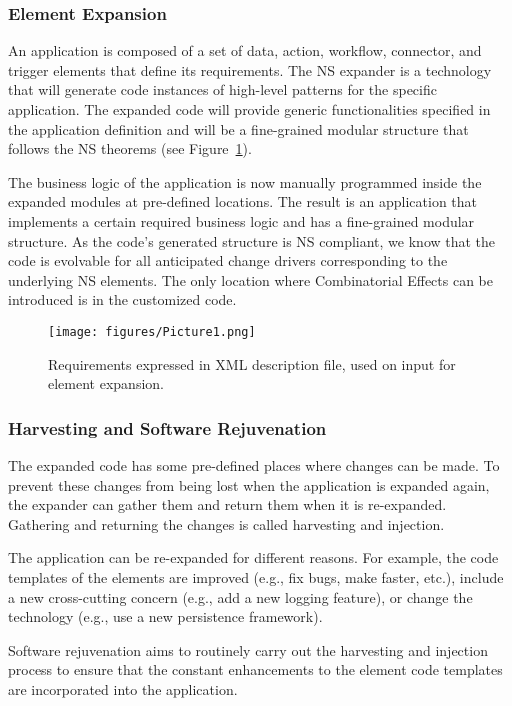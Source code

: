 \subsubsection{Element Expansion}\label{Element Expansion} An application is composed of a
set of data, action, workflow, connector, and trigger elements that define its
requirements. The NS expander is a technology that will generate code instances of
high-level patterns for the specific application. The expanded code will provide generic
functionalities specified in the application definition and will be a fine-grained modular
structure that follows the NS theorems (see Figure~\ref{fig_1}).

The business logic of the application is now manually programmed inside the expanded
modules at pre-defined locations. The result is an application that implements a certain
required business logic and has a fine-grained modular structure. As the code's generated
structure is NS compliant, we know that the code is evolvable for all anticipated change
drivers corresponding to the underlying NS elements. The only location where Combinatorial
Effects can be introduced is in the customized code.
\begin{figure}[htbp]
\centering
\centerline{\texttt{[image: figures/Picture1.png]}}
\caption{Requirements expressed in XML description file, used on input for element expansion.}
\label{fig_1}
\end{figure}

%
%
\subsubsection{Harvesting and Software Rejuvenation}\label{Harvesting and Software
Rejuvenation} The expanded code has some pre-defined places where changes can be made. To
prevent these changes from being lost when the application is expanded again, the expander
can gather them and return them when it is re-expanded. Gathering and returning the
changes is called harvesting and injection.

The application can be re-expanded for different reasons. For example, the code templates
of the elements are improved (e.g., fix bugs, make faster, etc.), include a new cross-cutting
concern (e.g., add a new logging feature), or change the technology (e.g., use a new persistence
framework).

Software rejuvenation aims to routinely carry out the harvesting and injection process to
ensure that the constant enhancements to the element code templates are incorporated into
the application.

